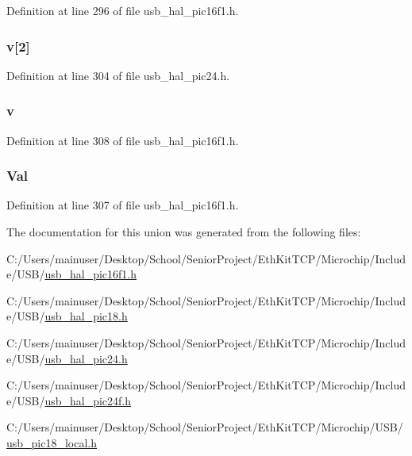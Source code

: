 Definition at line 296 of file usb\+\_\+hal\+\_\+pic16f1.\+h.

\hypertarget{union_____b_d_t_a1b3b3cfa7a4d868880bcc6feaadc7971}{}
\subsubsection[{v}]{ v\mbox{[}2\mbox{]}}\label{union_____b_d_t_a1b3b3cfa7a4d868880bcc6feaadc7971}


Definition at line 304 of file usb\+\_\+hal\+\_\+pic24.\+h.

\hypertarget{union_____b_d_t_a32c4cdd65ca9bf67a46f0a42448489d8}{}
\subsubsection[{v}]{ v}\label{union_____b_d_t_a32c4cdd65ca9bf67a46f0a42448489d8}


Definition at line 308 of file usb\+\_\+hal\+\_\+pic16f1.\+h.

\hypertarget{union_____b_d_t_a1a2aefd22f32fe19c7a40fd62958b591}{}
\subsubsection[{Val}]{ Val}\label{union_____b_d_t_a1a2aefd22f32fe19c7a40fd62958b591}


Definition at line 307 of file usb\+\_\+hal\+\_\+pic16f1.\+h.



The documentation for this union was generated from the following files\+:\begin{DoxyCompactItemize}
\item 
C\+:/\+Users/mainuser/\+Desktop/\+School/\+Senior\+Project/\+Eth\+Kit\+T\+C\+P/\+Microchip/\+Include/\+U\+S\+B/\hyperlink{usb__hal__pic16f1_8h}{usb\+\_\+hal\+\_\+pic16f1.\+h}\item 
C\+:/\+Users/mainuser/\+Desktop/\+School/\+Senior\+Project/\+Eth\+Kit\+T\+C\+P/\+Microchip/\+Include/\+U\+S\+B/\hyperlink{usb__hal__pic18_8h}{usb\+\_\+hal\+\_\+pic18.\+h}\item 
C\+:/\+Users/mainuser/\+Desktop/\+School/\+Senior\+Project/\+Eth\+Kit\+T\+C\+P/\+Microchip/\+Include/\+U\+S\+B/\hyperlink{usb__hal__pic24_8h}{usb\+\_\+hal\+\_\+pic24.\+h}\item 
C\+:/\+Users/mainuser/\+Desktop/\+School/\+Senior\+Project/\+Eth\+Kit\+T\+C\+P/\+Microchip/\+Include/\+U\+S\+B/\hyperlink{usb__hal__pic24f_8h}{usb\+\_\+hal\+\_\+pic24f.\+h}\item 
C\+:/\+Users/mainuser/\+Desktop/\+School/\+Senior\+Project/\+Eth\+Kit\+T\+C\+P/\+Microchip/\+U\+S\+B/\hyperlink{usb__pic18__local_8h}{usb\+\_\+pic18\+\_\+local.\+h}\end{DoxyCompactItemize}

